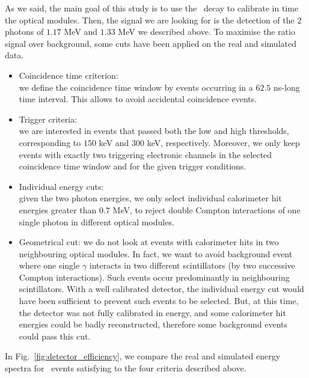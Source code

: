As we said, the main goal of this study is to use the \Co\ decay to calibrate in time the optical modules.
Then, the signal we are looking for is the detection of the $2$ photons of $1.17$ MeV and $1.33$ MeV we described above.
To maximise the ratio signal over background, some cuts have been applied on the real and simulated data.
\begin{itemize}
\item Coincidence time criterion:\\ we define the coincidence time window by events occurring in a $62.5$ ns-long time interval.
  This allows to avoid accidental coincidence events.
\item Trigger criteria:\\ we are interested in events that passed both the low and high thresholds, corresponding to $150$ keV and $300$ keV, respectively.
  Moreover, we only keep events with exactly two triggering electronic channels in the selected coincidence time window and for the given trigger conditions.
\item Individual energy cuts:\\ given the two photon energies, we only select individual calorimeter hit energies greater than $0.7$ MeV, to reject double Compton interactions of one single photon in different optical modules.
\item Geometrical cut: we do not look at events with calorimeter hits in two neighbouring optical modules.
  In fact, we want to avoid background event where one single $\gamma$ interacts in two different scintillators (by two successive Compton interactions).
  Such events occur predominantly in neighbouring scintillators.
  With a well calibrated detector, the individual energy cut would have been sufficient to prevent such events to be selected.
  But, at this time, the detector was not fully calibrated in energy, and some calorimeter hit energies could be badly reconstructed, therefore some background events could pass this cut.
\end{itemize}
In Fig.~\ref{fig:detector_efficiency}, we compare the real and simulated energy spectra for \Co\ events satisfying to the four criteria described above.

